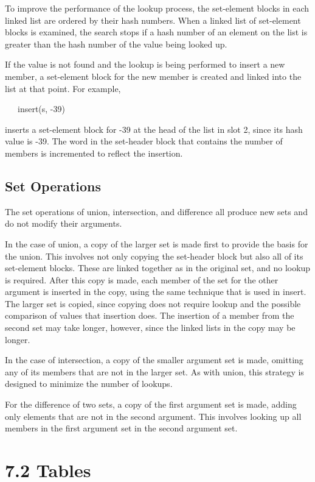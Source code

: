To improve the performance of the lookup process, the set-element
blocks in each linked list are ordered by their hash numbers. When a
linked list of set-element blocks is examined, the search stops if a
hash number of an element on the list is greater than the hash number
of the value being looked up.

If the value is not found and the lookup is being performed to insert
a new member, a set-element block for the new member is created and
linked into the list at that point. For example,

{\ttfamily\mdseries
\ \ \ insert(s, -39)}

\noindent inserts a set-element block for -39 at the head of the list
in slot 2, since its hash value is -39. The word in the set-header
block that contains the number of members is incremented to reflect
the insertion.

\subsection{Set Operations}

The set operations of union, intersection, and difference all produce
new sets and do not modify their arguments.


In the case of union, a copy of the larger set is made first to
provide the basis for the union. This involves not only copying the
set-header block but also all of its set-element blocks. These are
linked together as in the original set, and no lookup is
required. After this copy is made, each member of the set for the
other argument is inserted in the copy, using the same technique that
is used in insert. The larger set is copied, since copying does not
require lookup and the possible comparison of values that insertion
does. The insertion of a member from the second set may take longer,
however, since the linked lists in the copy may be longer.

In the case of intersection, a copy of the smaller argument set is
made, omitting any of its members that are not in the larger set. As
with union, this strategy is designed to minimize the number of
lookups.

For the difference of two sets, a copy of the first argument set is
made, adding only elements that are not in the second argument. This
involves looking up all members in the first argument set in the
second argument set.

\section[7.2 Tables]{7.2 Tables}
